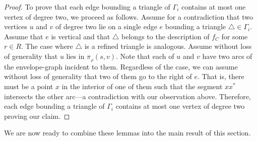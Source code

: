 \documentclass[a4paper,UKenglish]{socg-lipics-v2018}
\newcommand{\p}[3][P]{\ensuremath{\pi_{_{#1}}(#2, #3)}}
\begin{document}
{\begin{proof}
To prove that each edge bounding a triangle of $\Gamma_i$ contains at most one vertex of degree two, we proceed as follows.
Assume for a contradiction that two vertices $u$ and $v$ of degree two lie on a single edge $e$ bounding a triangle $\triangle\in \Gamma_i$.
Assume that $e$ is vertical and that $\triangle$ belongs to the description of $f_C$ for some $r\in R$. 
The case where $\triangle$ is a refined triangle is analogous. Assume without loss of generality that $u$ lies in $\p{s}{v}$.
Note that each of $u$ and $v$ have two arcs of the envelope-graph incident to them.
Regardless of the case, we can assume without loss of generality that two of them go to the right of $e$. 
That is, there must be a point $x$ in the interior of one of them such that the segment $x x^*$ intersects the other arc---a contradiction with our observation above.
Therefore, each edge bounding a triangle of $\Gamma_i$ contains at most one vertex of degree two proving our claim.
\end{proof}
}

We are now ready to combine these lemmas into the main result of this section.
\end{document}
